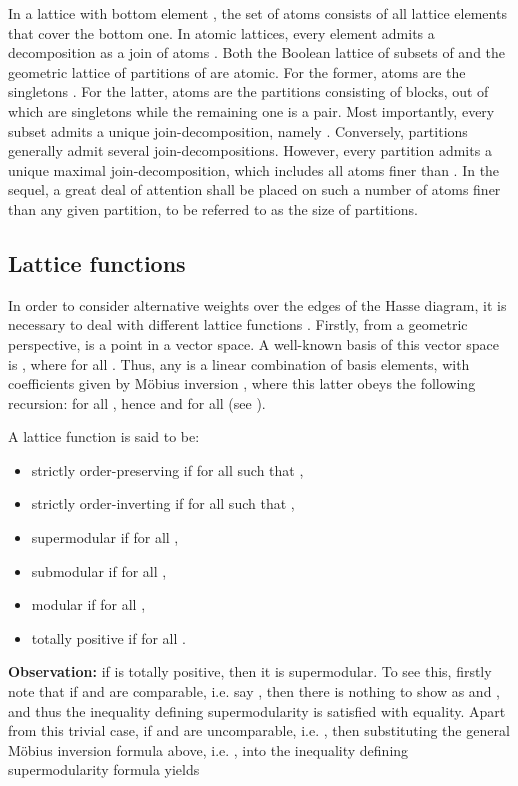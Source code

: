\documentclass[a4paper,10pt]{article}
\begin{document}
In a lattice  with bottom element , the set  of atoms consists of all lattice elements that cover the bottom one.
In atomic lattices, every element  admits a decomposition  as a join of atoms . Both the Boolean lattice
 of subsets of  and the geometric lattice  of partitions of  are atomic. For the former, atoms are the  singletons
. For the latter, atoms are the  partitions consisting of  blocks, out of which  are singletons while the remaining one is a pair. Most
importantly, every subset  admits a unique join-decomposition, namely . Conversely, partitions generally admit several join-decompositions.
However, every partition  admits a unique maximal join-decomposition, which includes all atoms finer than . In the sequel, a great deal of attention shall
be placed on such a number of atoms finer than any given partition, to be referred to as the size of partitions.

\subsection{Lattice functions}
In order to consider alternative weights over the edges of the Hasse diagram, it is necessary to deal with different lattice functions . Firstly,
from a geometric perspective,  is a point in a vector space. A well-known basis of this vector space is , where
 for all . Thus, any  is a linear combination
 of basis elements, with coefficients  given by M\"obius inversion , where this latter obeys the
following recursion:  for all , hence  and  for all  (see
\cite{Aigner79,RotaMobius,Stern99}).

A lattice function  is said to be:
\begin{itemize}
\item strictly order-preserving if  for all  such that ,
\item strictly order-inverting if  for all  such that ,
\item supermodular if  for all ,
\item submodular if  for all ,
\item modular if  for all ,
\item totally positive if  for all .
\end{itemize}
\textbf{Observation:} if  is totally positive, then it is supermodular. To see this, firstly note that if  and  are comparable, i.e. say , then there is
nothing to show as  and , and thus the inequality defining supermodularity is satisfied with equality. Apart from this trivial case, if  and  are
uncomparable, i.e. , then substituting the general M\"obius inversion formula above, i.e. , into the inequality
defining supermodularity formula yields 
\end{document}
